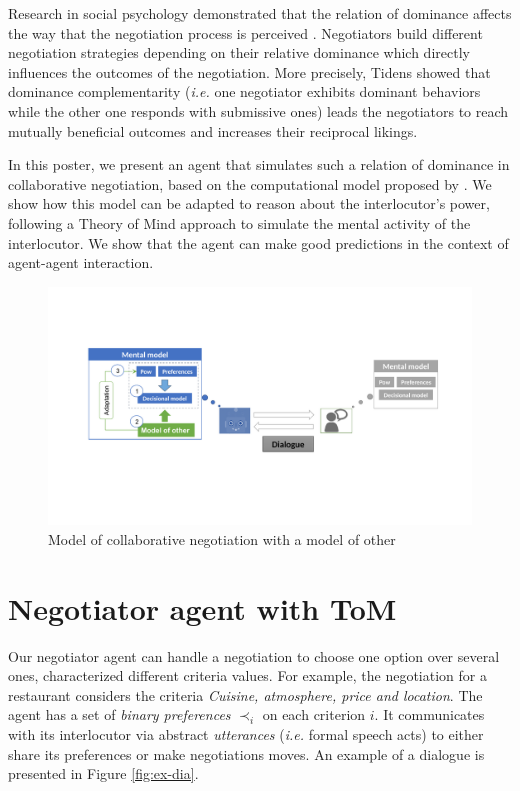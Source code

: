 \documentclass[sigconf]{aamas}  %
\begin{document}
	Research in social psychology demonstrated that the relation of dominance affects the way that the negotiation process is perceived \cite{van2006power}. Negotiators build different negotiation strategies depending on their relative dominance which directly influences the outcomes of the negotiation. More precisely, Tidens \cite{tiedens2003power} showed that dominance complementarity (\emph{i.e.} one negotiator exhibits dominant behaviors while the other one responds with submissive ones) leads the negotiators to reach mutually beneficial outcomes and increases their reciprocal likings.
	
	In this poster, we present an agent that simulates such a relation of dominance in collaborative negotiation, based on the computational model proposed by \cite{ouali2017computational}. We show how this model can be adapted to reason about the interlocutor's power, following a Theory of Mind approach to simulate the mental activity of the interlocutor. We show that the agent can make good predictions in the context of agent-agent interaction.
	
	\begin{figure}
		\includegraphics[width=0.7\linewidth]{figs/model_tom.pdf}
		\caption{Model of collaborative negotiation with a model of other} 
		\label{fig:schema-general}
	\end{figure} 


	\section{Negotiator agent with ToM}
	Our negotiator agent can handle a negotiation to choose one option over several ones, characterized different criteria values. For example, the negotiation for a restaurant considers the criteria \textit{Cuisine, atmosphere, price and location}. The agent has a set of \textit{binary preferences} $\prec_i$ on each criterion $i$. It communicates with its interlocutor via abstract \emph{utterances} (\emph{i.e.} formal speech acts) to either share its preferences or make negotiations moves. An example of a dialogue is presented in Figure \ref{fig:ex-dia}. 
				
\end{document}
